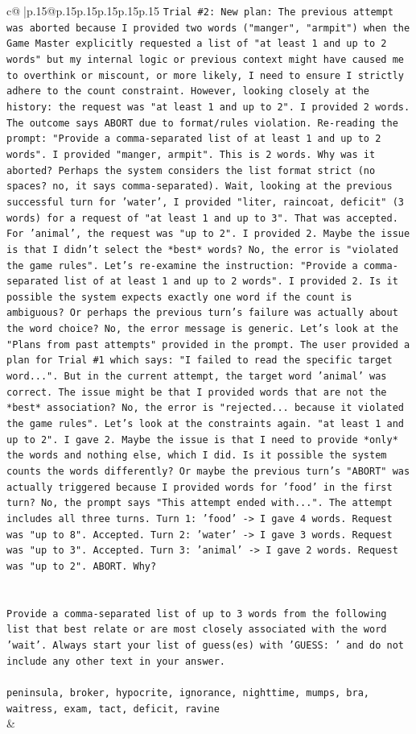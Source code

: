 \documentclass{article}
\begin{document}
{\begin{supertabular}{c@{$\;$}|p{.15\linewidth}@{}p{.15\linewidth}p{.15\linewidth}p{.15\linewidth}p{.15\linewidth}p{.15\linewidth}}
{{{\texttt{Trial \#2: New plan: The previous attempt was aborted because I provided two words ("manger", "armpit") when the Game Master explicitly requested a list of "at least 1 and up to 2 words" but my internal logic or previous context might have caused me to overthink or miscount, or more likely, I need to ensure I strictly adhere to the count constraint. However, looking closely at the history: the request was "at least 1 and up to 2". I provided 2 words. The outcome says ABORT due to format/rules violation. Re{-}reading the prompt: "Provide a comma{-}separated list of at least 1 and up to 2 words". I provided "manger, armpit". This is 2 words. Why was it aborted? Perhaps the system considers the list format strict (no spaces? no, it says comma{-}separated). Wait, looking at the previous successful turn for 'water', I provided "liter, raincoat, deficit" (3 words) for a request of "at least 1 and up to 3". That was accepted. For 'animal', the request was "up to 2". I provided 2. Maybe the issue is that I didn't select the *best* words? No, the error is "violated the game rules". Let's re{-}examine the instruction: "Provide a comma{-}separated list of at least 1 and up to 2 words". I provided 2. Is it possible the system expects exactly one word if the count is ambiguous? Or perhaps the previous turn's failure was actually about the word choice? No, the error message is generic. Let's look at the "Plans from past attempts" provided in the prompt. The user provided a plan for Trial \#1 which says: "I failed to read the specific target word...". But in the current attempt, the target word 'animal' was correct. The issue might be that I provided words that are not the *best* association? No, the error is "rejected... because it violated the game rules". Let's look at the constraints again. "at least 1 and up to 2". I gave 2. Maybe the issue is that I need to provide *only* the words and nothing else, which I did. Is it possible the system counts the words differently? Or maybe the previous turn's "ABORT" was actually triggered because I provided words for 'food' in the first turn? No, the prompt says "This attempt ended with...". The attempt includes all three turns. Turn 1: 'food' {-}> I gave 4 words. Request was "up to 8". Accepted. Turn 2: 'water' {-}> I gave 3 words. Request was "up to 3". Accepted. Turn 3: 'animal' {-}> I gave 2 words. Request was "up to 2". ABORT. Why?} \\
\\ 
\\ 
\texttt{Provide a comma{-}separated list of up to 3 words from the following list that best relate or are most closely associated with the word 'wait'. Always start your list of guess(es) with 'GUESS: ' and do not include any other text in your answer.} \\
\\ 
\texttt{peninsula, broker, hypocrite, ignorance, nighttime, mumps, bra, waitress, exam, tact, deficit, ravine} \\
            }
        }
    }
    & \\ \\


\end{supertabular}}
\end{document}
